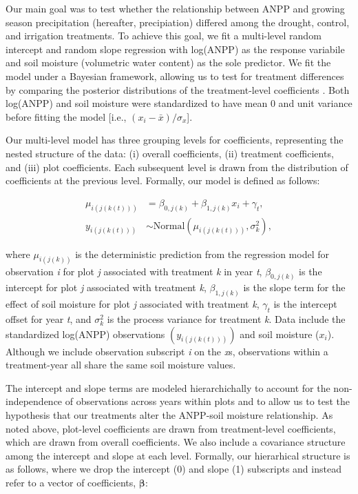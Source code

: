 \documentclass[fleqn,10pt]{wlpeerj} %
\begin{document}
Our main goal was to test whether the relationship between ANPP and
growing season precipitation (hereafter, precipiation) differed among
the drought, control, and irrigation treatments. To achieve this goal,
we fit a multi-level random intercept and random slope regression with
log(ANPP) as the response variabile and soil moisture (volumetric water
content) as the sole predictor. We fit the model under a Bayesian
framework, allowing us to test for treatment differences by comparing
the posterior distributions of the treatment-level coefficients
\citep[e.g.,][]{Tredennick2013}. Both log(ANPP) and soil moisture were
standardized to have mean 0 and unit variance before fitting the model
{[}i.e., \((x_i - \bar{x})/\sigma_x\){]}.

Our multi-level model has three grouping levels for coefficients,
representing the nested structure of the data: (i) overall coefficients,
(ii) treatment coefficients, and (iii) plot coefficients. Each
subsequent level is drawn from the distribution of coefficients at the
previous level. Formally, our model is defined as follows:

\vspace{-2em}

\begin{align}
\mu_{i(j(k(t)))} &= \beta_{0,j(k)} + \beta_{1,j(k)}x_i + \gamma_t, \\
y_{i(j(k(t)))} &\sim \text{Normal} \left(\mu_{i(j(k(t)))}, \sigma^2_{k} \right),
\end{align}

\noindent{} where \(\mu_{i(j(k))}\) is the deterministic prediction from
the regression model for observation \emph{i} for plot \emph{j}
associated with treatment \emph{k} in year \emph{t}, \(\beta_{0,j(k)}\)
is the intercept for plot \emph{j} associated with treatment \emph{k},
\(\beta_{1,j(k)}\) is the slope term for the effect of soil moisture for
plot \emph{j} associated with treatment \emph{k}, \(\gamma_t\) is the
intercept offset for year \emph{t}, and \(\sigma^2_k\) is the process
variance for treatment \emph{k}. Data include the standardized log(ANPP)
observations \(\left( y_{i(j(k(t)))} \right)\) and soil moisture
(\(x_i\)). Although we include observation subscript \emph{i} on the
\emph{x}s, observations within a treatment-year all share the same soil
moisture values.

The intercept and slope terms are modeled hierarchichally to account for
the non-independence of observations across years within plots and to
allow us to test the hypothesis that our treatments alter the ANPP-soil
moisture relationship. As noted above, plot-level coefficients are drawn
from treatment-level coefficients, which are drawn from overall
coefficients. We also include a covariance structure among the intercept
and slope at each level. Formally, our hierarhical structure is as
follows, where we drop the intercept (0) and slope (1) subscripts and
instead refer to a vector of coefficients, \(\boldsymbol{\beta}\):
\end{document}
